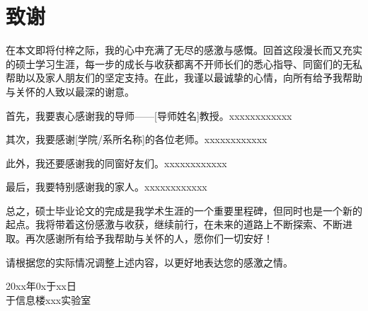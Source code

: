 \newpage
\songti\xiaosi
\chapter*{\heiti\sanhao\textbf{致\quad 谢}}

在本文即将付梓之际，我的心中充满了无尽的感激与感慨。回首这段漫长而又充实的硕士学习生涯，每一步的成长与收获都离不开师长们的悉心指导、同窗们的无私帮助以及家人朋友们的坚定支持。在此，我谨以最诚挚的心情，向所有给予我帮助与关怀的人致以最深的谢意。

首先，我要衷心感谢我的导师——[导师姓名]教授。xxxxxxxxxxxx

其次，我要感谢[学院/系所名称]的各位老师。xxxxxxxxxxxx

此外，我还要感谢我的同窗好友们。xxxxxxxxxxxx

最后，我要特别感谢我的家人。xxxxxxxxxxxx

总之，硕士毕业论文的完成是我学术生涯的一个重要里程碑，但同时也是一个新的起点。我将带着这份感激与收获，继续前行，在未来的道路上不断探索、不断进取。再次感谢所有给予我帮助与关怀的人，愿你们一切安好！

请根据您的实际情况调整上述内容，以更好地表达您的感激之情。

\vspace{20pt}
\begin{flushright}
    20xx年0x于xx日 \\
    于信息楼xxx实验室
\end{flushright}


